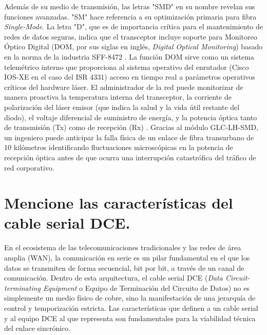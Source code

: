 \documentclass[a4paper,12pt]{article}
\begin{document}
Además de su medio de transmisión, las letras "SMD" en su nombre revelan sus funciones avanzadas. "SM" hace referencia a su optimización primaria para fibra \textit{Single-Mode}. La letra "D", que es de importancia crítica para el mantenimiento de redes de datos seguras, indica que el transceptor incluye soporte para Monitoreo Óptico Digital (DOM, por sus siglas en inglés, \textit{Digital Optical Monitoring}) basado en la norma de la industria SFF-8472 \cite{glc_lh_smd_specs, cisco_transceiver_matrix}. La función DOM sirve como un sistema telemétrico interno que proporciona al sistema operativo del enrutador (Cisco IOS-XE en el caso del ISR 4331) acceso en tiempo real a parámetros operativos críticos del hardware láser. El administrador de la red puede monitorizar de manera proactiva la temperatura interna del transceptor, la corriente de polarización del láser emisor (que indica la salud y la vida útil restante del diodo), el voltaje diferencial de suministro de energía, y la potencia óptica tanto de transmisión (Tx) como de recepción (Rx) \cite{glc_lh_smd_specs}. Gracias al módulo GLC-LH-SMD, un ingeniero puede anticipar la falla física de un enlace de fibra transurbano de 10 kilómetros identificando fluctuaciones microscópicas en la potencia de recepción óptica antes de que ocurra una interrupción catastrófica del tráfico de red corporativo.

\section{Mencione las características del cable serial DCE.}

En el ecosistema de las telecomunicaciones tradicionales y las redes de área amplia (WAN), la comunicación en serie es un pilar fundamental en el que los datos se transmiten de forma secuencial, bit por bit, a través de un canal de comunicación. Dentro de esta arquitectura, el cable serial DCE (\textit{Data Circuit-terminating Equipment} o Equipo de Terminación del Circuito de Datos) no es simplemente un medio físico de cobre, sino la manifestación de una jerarquía de control y temporización estricta. Las características que definen a un cable serial y al equipo DCE al que representa son fundamentales para la viabilidad técnica del enlace sincrónico.
\end{document}
